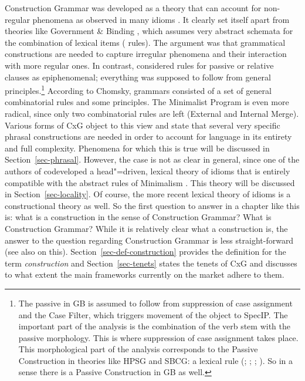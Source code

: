 \documentclass[output=paper,biblatex,babelshorthands,newtxmath,draftmode,colorlinks,citecolor=brown]{langscibook}
\begin{document}

Construction Grammar was developed as a theory that can account for non-regular phenomena as observed
in many idioms \citep*{FKoC88a}. It clearly set itself apart from theories like Government \& Binding\indexgb
\citep{Chomsky81a}, which assumes very abstract schemata for the combination of lexical items (\xbar
rules). The argument was that grammatical constructions are needed to capture irregular phenomena
and their interaction with more regular ones. In contrast, \citet[]{Chomsky81a} considered
rules for passive or relative clauses as epiphenomenal; everything was supposed to follow from
general principles.\footnote{
  The passive in GB is assumed to follow from suppression of case assignment and the Case Filter,
  which triggers movement of the object to SpecIP. The important part of the analysis is the combination of the verb stem
  with the passive morphology. This is where suppression of case assignment takes place. This
  morphological part of the analysis corresponds to the Passive Construction in theories like HPSG
  and SBCG: a lexical rule (\citealt[]{ps}; \citealt{Mueller2003e}; \citealt{MOe2013a}; ). So in a sense there is a Passive Construction in GB as well.%
} According to Chomsky, grammars consisted of a set of general combinatorial rules
and some principles. The Minimalist Program \citep{Chomsky95a-u} is even more radical, since only two combinatorial rules
are left (External and Internal Merge). Various forms of CxG object to this view and state that
several very specific phrasal constructions are needed in order to account for language in its
entirety and full complexity. Phenomena for which this is true will be discussed in
Section~\ref{sec-phrasal}. However, the case is not as clear in general, since one of the authors of
\citet*{FKoC88a} codeveloped a head"=driven, lexical theory of idioms that is entirely compatible with the abstract rules of
Minimalism \citep*{Sag2007a,KSF2015a,KM2019a}. This theory will be discussed in
Section~\ref{sec-locality}. Of course, the more recent lexical theory of idioms is a constructional
theory as well. So the first question to answer in a chapter like this is: what is a construction in
the sense of Construction Grammar? What is Construction Grammar? While it is
relatively clear what a construction is, the answer to the question regarding Construction Grammar
is less straight-forward (see also \citealt[]{Fillmore88a} on this). Section~\ref{sec-def-construction} provides the definition for the term
\emph{construction} and Section~\ref{sec-tenets} states the tenets of CxG and discusses to what
extent the main frameworks currently on the market adhere to them.
\end{document}
